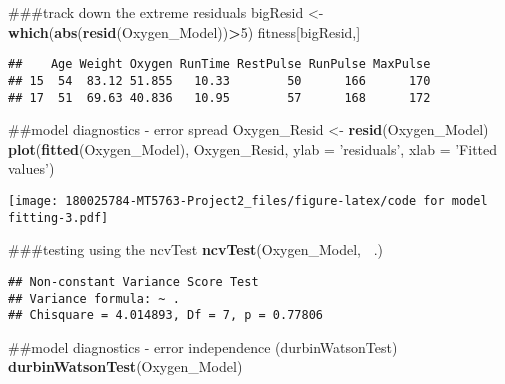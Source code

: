 \documentclass[]{article}
\newenvironment{Shaded}{\begin{snugshade}}{\end{snugshade}}
\newcommand{\KeywordTok}[1]{\textcolor[rgb]{0.13,0.29,0.53}{\textbf{#1}}}
\newcommand{\DataTypeTok}[1]{\textcolor[rgb]{0.13,0.29,0.53}{#1}}
\newcommand{\DecValTok}[1]{\textcolor[rgb]{0.00,0.00,0.81}{#1}}
\newcommand{\StringTok}[1]{\textcolor[rgb]{0.31,0.60,0.02}{#1}}
\newcommand{\OperatorTok}[1]{\textcolor[rgb]{0.81,0.36,0.00}{\textbf{#1}}}
\newcommand{\NormalTok}[1]{#1}
\begin{document}
\begin{Shaded}
\begin{Highlighting}[]
\NormalTok{###track down the extreme residuals}
\NormalTok{bigResid <-}\StringTok{ }\KeywordTok{which}\NormalTok{(}\KeywordTok{abs}\NormalTok{(}\KeywordTok{resid}\NormalTok{(Oxygen_Model))}\OperatorTok{>}\DecValTok{5}\NormalTok{)}
\NormalTok{fitness[bigResid,]}
\end{Highlighting}
\end{Shaded}

\begin{verbatim}
##    Age Weight Oxygen RunTime RestPulse RunPulse MaxPulse
## 15  54  83.12 51.855   10.33        50      166      170
## 17  51  69.63 40.836   10.95        57      168      172
\end{verbatim}

\begin{Shaded}
\begin{Highlighting}[]
\NormalTok{##model diagnostics - error spread}
\NormalTok{Oxygen_Resid <-}\StringTok{ }\KeywordTok{resid}\NormalTok{(Oxygen_Model)}
\KeywordTok{plot}\NormalTok{(}\KeywordTok{fitted}\NormalTok{(Oxygen_Model), Oxygen_Resid, }\DataTypeTok{ylab =} \StringTok{'residuals'}\NormalTok{, }\DataTypeTok{xlab =} \StringTok{'Fitted values'}\NormalTok{)}
\end{Highlighting}
\end{Shaded}

\texttt{[image: 180025784-MT5763-Project2\_files/figure-latex/code for model fitting-3.pdf]}

\begin{Shaded}
\begin{Highlighting}[]
\NormalTok{###testing using the ncvTest}
\KeywordTok{ncvTest}\NormalTok{(Oxygen_Model, }\OperatorTok{~}\NormalTok{.)}
\end{Highlighting}
\end{Shaded}

\begin{verbatim}
## Non-constant Variance Score Test 
## Variance formula: ~ . 
## Chisquare = 4.014893, Df = 7, p = 0.77806
\end{verbatim}

\begin{Shaded}
\begin{Highlighting}[]
\NormalTok{##model diagnostics - error independence (durbinWatsonTest)}
\KeywordTok{durbinWatsonTest}\NormalTok{(Oxygen_Model)}
\end{Highlighting}
\end{Shaded}
\end{document}
